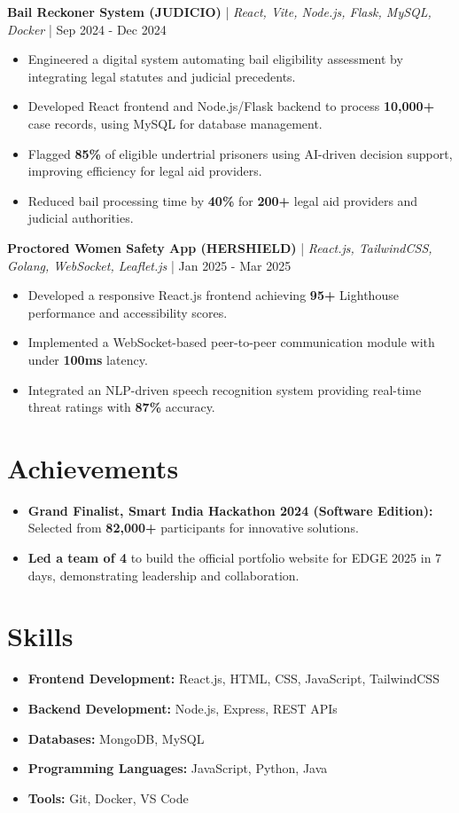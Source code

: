\documentclass{article}
\begin{document}
\textbf{Bail Reckoner System (JUDICIO)} | \textit{React, Vite, Node.js, Flask, MySQL, Docker} | Sep 2024 - Dec 2024
\begin{itemize}[leftmargin=*, nosep]
    \item Engineered a digital system automating bail eligibility assessment by integrating legal statutes and judicial precedents.
    \item Developed React frontend and Node.js/Flask backend to process \textbf{10,000+} case records, using MySQL for database management.
    \item Flagged \textbf{85\%} of eligible undertrial prisoners using AI-driven decision support, improving efficiency for legal aid providers.
    \item Reduced bail processing time by \textbf{40\%} for \textbf{200+} legal aid providers and judicial authorities.
\end{itemize}

\textbf{Proctored Women Safety App (HERSHIELD)} | \textit{React.js, TailwindCSS, Golang, WebSocket, Leaflet.js} | Jan 2025 - Mar 2025
\begin{itemize}[leftmargin=*, nosep]
    \item Developed a responsive React.js frontend achieving \textbf{95+} Lighthouse performance and accessibility scores.
    \item Implemented a WebSocket-based peer-to-peer communication module with under \textbf{100ms} latency.
    \item Integrated an NLP-driven speech recognition system providing real-time threat ratings with \textbf{87\%} accuracy.
\end{itemize}

\section*{Achievements}
\begin{itemize}[leftmargin=*, nosep]
    \item \textbf{Grand Finalist, Smart India Hackathon 2024 (Software Edition):} Selected from \textbf{82,000+} participants for innovative solutions.
    \item \textbf{Led a team of 4} to build the official portfolio website for EDGE 2025 in 7 days, demonstrating leadership and collaboration.
\end{itemize}

\section*{Skills}
\begin{itemize}[leftmargin=*, nosep]
    \item \textbf{Frontend Development:} React.js, HTML, CSS, JavaScript, TailwindCSS
    \item \textbf{Backend Development:} Node.js, Express, REST APIs
    \item \textbf{Databases:} MongoDB, MySQL
    \item \textbf{Programming Languages:} JavaScript, Python, Java
    \item \textbf{Tools:} Git, Docker, VS Code
\end{itemize}
\end{document}
